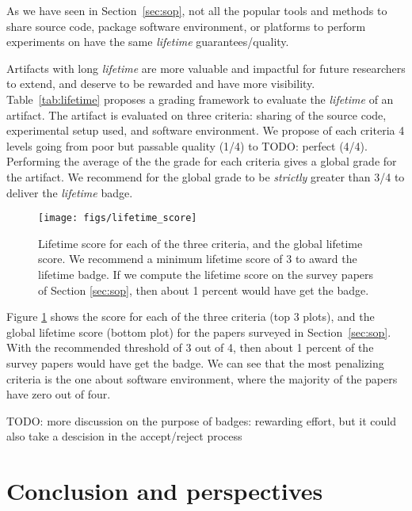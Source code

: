 \documentclass[sigconf,natbib=false]{acmart}
\newcommand{\todo}[1]{{\color{red}TODO: #1}}
\begin{document}
As we have seen in Section\ \ref{sec:sop}, not all the popular tools and methods to share source code, package software environment, or platforms to perform experiments on have the same \emph{lifetime} guarantees/quality.

Artifacts with long \emph{lifetime} are more valuable and impactful for future researchers to extend, and deserve to be rewarded and have more visibility.
Table\ \ref{tab:lifetime} proposes a grading framework to evaluate the \emph{lifetime} of an artifact.
The artifact is evaluated on three criteria: sharing of the source code, experimental setup used, and software environment. 
We propose of each criteria 4 levels going from poor but passable quality (1/4) to \todo{perfect} (4/4).
Performing the average of the the grade for each criteria gives a global grade for the artifact.
We recommend for the global grade to be \emph{strictly} greater than 3/4 to deliver the \emph{lifetime} badge.


\begin{figure}
  \centering
    \texttt{[image: figs/lifetime\_score]}
  \caption{Lifetime score for each of the three criteria, and the global lifetime score. We recommend a minimum lifetime score of 3 to award the lifetime badge. If we compute the lifetime score on the survey papers of Section \ref{sec:sop}, then about 1 percent would have get the badge.}\label{fig:lifetime_score}
\end{figure}

Figure \ref{fig:lifetime_score} shows the score for each of the three criteria (top 3 plots), and the global lifetime score (bottom plot) for the papers surveyed in Section\ \ref{sec:sop}.
With the recommended threshold of 3 out of 4, then about 1 percent of the survey papers would have get the badge.
We can see that the most penalizing criteria is the one about software environment, where the majority of the papers have zero out of four.

\todo{more discussion on the purpose of badges: rewarding effort, but it could also take a descision in the accept/reject process}


\section{Conclusion and perspectives}
\end{document}

